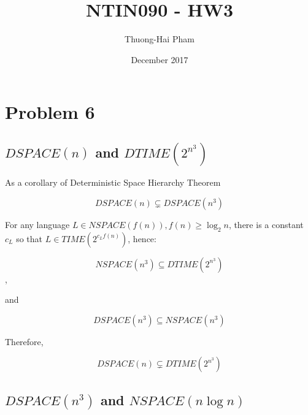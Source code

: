 \documentclass{article}
\title{NTIN090 - HW3}
\author{Thuong-Hai Pham}
\date{December 2017}
\begin{document}
\maketitle

\section{Problem 6}

% 
% 
% 


\subsection{$DSPACE(n)$ and $DTIME(2^{n^3})$}

As a corollary of Deterministic Space Hierarchy Theorem

\[DSPACE(n) \subsetneq DSPACE(n^3)\]

For any language $L\in NSPACE(f(n)), f(n)\geq \log_2n$, there is a constant $c_L$ so that $L\in TIME(2^{c_Lf(n)})$, hence: 

\[NSPACE(n^3) \subseteq DTIME(2^{n^3})\],

and

\[DSPACE(n^3) \subseteq NSPACE(n^3)\]

Therefore,

\[DSPACE(n) \subsetneq DTIME(2^{n^3})\]


\subsection{$DSPACE(n^3)$ and $NSPACE(n\log n)$}
\end{document}

